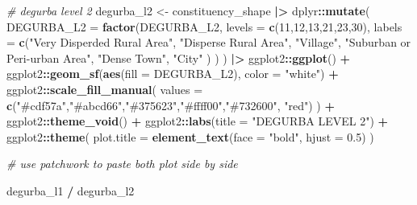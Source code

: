 \documentclass[
]{article}
\newenvironment{Shaded}{\begin{snugshade}}{\end{snugshade}}
\newcommand{\AttributeTok}[1]{\textcolor[rgb]{0.13,0.29,0.53}{#1}}
\newcommand{\CommentTok}[1]{\textcolor[rgb]{0.56,0.35,0.01}{\textit{#1}}}
\newcommand{\DecValTok}[1]{\textcolor[rgb]{0.00,0.00,0.81}{#1}}
\newcommand{\FloatTok}[1]{\textcolor[rgb]{0.00,0.00,0.81}{#1}}
\newcommand{\FunctionTok}[1]{\textcolor[rgb]{0.13,0.29,0.53}{\textbf{#1}}}
\newcommand{\NormalTok}[1]{#1}
\newcommand{\OtherTok}[1]{\textcolor[rgb]{0.56,0.35,0.01}{#1}}
\newcommand{\SpecialCharTok}[1]{\textcolor[rgb]{0.81,0.36,0.00}{\textbf{#1}}}
\newcommand{\StringTok}[1]{\textcolor[rgb]{0.31,0.60,0.02}{#1}}
\newenvironment{UNFPAShadedBox}{%
\begin{tcolorbox}[sharp corners, enhanced, colback=white, boxrule=0pt, borderline west={2pt}{0pt}{orange}]%
}{\end{tcolorbox}}
\newenvironment{Highlighting}{\begin{UNFPAShadedBox}}{\end{UNFPAShadedBox}}
\begin{document}
\begin{Shaded}
\begin{Highlighting}[]
\CommentTok{\# degurba level 2}
\NormalTok{degurba\_l2 }\OtherTok{\textless{}{-}}\NormalTok{ constituency\_shape }\SpecialCharTok{|\textgreater{}}
\NormalTok{  dplyr}\SpecialCharTok{::}\FunctionTok{mutate}\NormalTok{(}
    \AttributeTok{DEGURBA\_L2 =} \FunctionTok{factor}\NormalTok{(DEGURBA\_L2, }
                           \AttributeTok{levels =} \FunctionTok{c}\NormalTok{(}\DecValTok{11}\NormalTok{,}\DecValTok{12}\NormalTok{,}\DecValTok{13}\NormalTok{,}\DecValTok{21}\NormalTok{,}\DecValTok{23}\NormalTok{,}\DecValTok{30}\NormalTok{), }
                           \AttributeTok{labels =} \FunctionTok{c}\NormalTok{(}\StringTok{"Very Disperded Rural Area"}\NormalTok{,}
                                      \StringTok{"Disperse Rural Area"}\NormalTok{,}
                                      \StringTok{"Village"}\NormalTok{,}
                                      \StringTok{"Suburban or Peri{-}urban Area"}\NormalTok{,}
                                      \StringTok{"Dense Town"}\NormalTok{,}
                                      \StringTok{"City"}
\NormalTok{                                      )}
\NormalTok{                           )}
\NormalTok{    ) }\SpecialCharTok{|\textgreater{}}
\NormalTok{  ggplot2}\SpecialCharTok{::}\FunctionTok{ggplot}\NormalTok{() }\SpecialCharTok{+}
\NormalTok{  ggplot2}\SpecialCharTok{::}\FunctionTok{geom\_sf}\NormalTok{(}\FunctionTok{aes}\NormalTok{(}\AttributeTok{fill =}\NormalTok{ DEGURBA\_L2), }\AttributeTok{color =} \StringTok{"white"}\NormalTok{) }\SpecialCharTok{+}
\NormalTok{  ggplot2}\SpecialCharTok{::}\FunctionTok{scale\_fill\_manual}\NormalTok{(}
    \AttributeTok{values =} \FunctionTok{c}\NormalTok{(}\StringTok{"\#cdf57a"}\NormalTok{,}\StringTok{"\#abcd66"}\NormalTok{,}\StringTok{"\#375623"}\NormalTok{,}\StringTok{"\#ffff00"}\NormalTok{,}\StringTok{"\#732600"}\NormalTok{, }\StringTok{"red"}\NormalTok{)}
\NormalTok{    ) }\SpecialCharTok{+}
\NormalTok{  ggplot2}\SpecialCharTok{::}\FunctionTok{theme\_void}\NormalTok{() }\SpecialCharTok{+}
\NormalTok{  ggplot2}\SpecialCharTok{::}\FunctionTok{labs}\NormalTok{(}\AttributeTok{title =} \StringTok{"DEGURBA LEVEL 2"}\NormalTok{) }\SpecialCharTok{+}
\NormalTok{  ggplot2}\SpecialCharTok{::}\FunctionTok{theme}\NormalTok{(}
    \AttributeTok{plot.title =} \FunctionTok{element\_text}\NormalTok{(}\AttributeTok{face =} \StringTok{"bold"}\NormalTok{, }\AttributeTok{hjust =} \FloatTok{0.5}\NormalTok{)}
\NormalTok{  )}

\CommentTok{\# use patchwork to paste both plot side by side}

\NormalTok{degurba\_l1 }\SpecialCharTok{/}\NormalTok{ degurba\_l2}
\end{Highlighting}
\end{Shaded}
\end{document}
